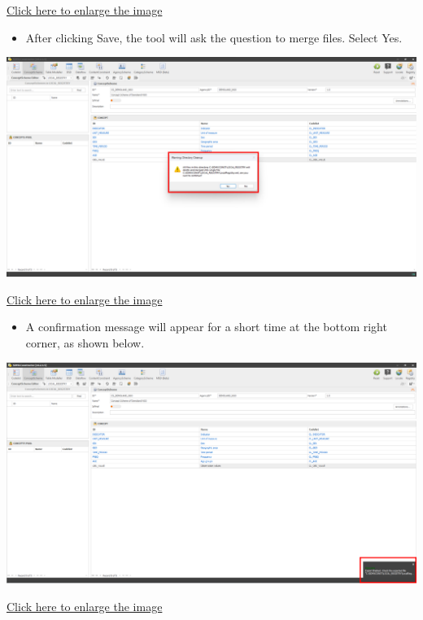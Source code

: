 \documentclass[
]{book}
\providecommand{\tightlist}{%
  \setlength{\itemsep}{0pt}\setlength{\parskip}{0pt}}
\begin{document}
\href{images/image283.png}{Click here to enlarge the image}

\begin{itemize}
\tightlist
\item
  After clicking Save, the tool will ask the question to merge files. Select Yes.
\end{itemize}

\begin{center}\includegraphics[width=1\linewidth]{./images/image284} \end{center}

\href{images/image284.png}{Click here to enlarge the image}

\begin{itemize}
\tightlist
\item
  A confirmation message will appear for a short time at the bottom right corner, as shown below.
\end{itemize}

\begin{center}\includegraphics[width=1\linewidth]{./images/image285} \end{center}

\href{images/image285.png}{Click here to enlarge the image}
\end{document}
